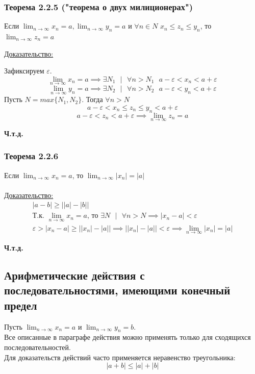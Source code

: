 \documentclass[12pt]{article}
\begin{document}
    \subsubsection*{Теорема 2.2.5 ("теорема о двух милиционерах")}\label{th:2.2.5}
    Если $\lim_{n\to\infty} x_n = a, \lim_{n\to\infty} y_n = a$ и $\forall n \in N$ $x_n \le z_{n} \le y_n$, то $\lim_{n\to\infty} z_{n} = a$\par\noindent
    \underline{Доказательство:}
    \begin{adjustwidth}{1.5em}{1.5em}
        Зафиксируем $\varepsilon$.\\
        \[\lim_{n\to\infty} x_n = a \implies \exists N_{1} \text{ } \big| \text{ } \forall n > N_{1} \text{ } a-\varepsilon < x_n < a + \varepsilon\]
        \[\lim_{n\to\infty} y_n = a \implies \exists N_{2} \text{ } \big| \text{ } \forall n > N_{2} \text{ } a-\varepsilon < y_n < a + \varepsilon\]
        Пусть $N = max\{N_{1}, N_{2}\}$. Тогда $\forall n > N$
        \[a-\varepsilon < x_n \le z_{n} \le y_n < a + \varepsilon\]
        \[a - \varepsilon < z_{n} < a + \varepsilon \implies \lim_{n\to\infty} z_{n} = a\]
        \begin{center}
            \textbf{Ч.т.д.}
        \end{center}
    \end{adjustwidth}

    \subsubsection*{Теорема 2.2.6}\label{th:2.2.6}
    Если $\lim_{n\to\infty} x_n = a$, то $\lim_{n\to\infty} |x_n| = |a|$\\\\
    \underline{Доказательство:} 
    \begin{gather*}
        |a-b| \ge \big||a|-|b|\big|\\
        \text{Т.к. } \lim_{n\to\infty} x_n = a \text{, то } \exists N \text{ } \big| \text{ } \forall n > N \implies |x_n - a| < \varepsilon\\
        \varepsilon > |x_n - a| \ge \big||x_n| - |a|\big| \implies \big||x_n| - |a|\big| < \varepsilon \implies \lim_{n\to\infty}|x_n| = |a|
    \end{gather*}
    \begin{center}
        \textbf{Ч.т.д.}
    \end{center}

    \subsection{Арифметические действия с последовательностями, имеющими конечный предел}
    \noindent Пусть $\lim_{n\to\infty}x_n = a$ и $\lim_{n\to\infty}y_n=b$.\\
    Все описанные в параграфе действия можно применять только для сходящихся последовательностей.\\
    Для доказательств действий часто применяется неравенство треугольника:
    \[|a+b| \le |a| + |b|\]
\end{document}
